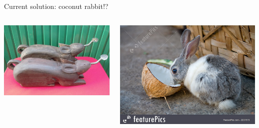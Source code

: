 \documentclass[10pt, svgnames]{beamer}
\begin{document}
\begin{frame}[label={sec:org1357d81}]{Current solution: coconut rabbit!?}
\begin{columns}
  \begin{column}{0.45\columnwidth}
    \begin{center}
      \includegraphics[width=\linewidth]{./pictures/coconut-rabbit.jpg}
    \end{center} 
  \end{column}

  \begin{column}{0.45\columnwidth}
    \begin{center}
      \includegraphics[width=\linewidth]{./pictures/rabbit-eating-coconut.jpg}
    \end{center}
  \end{column}
\end{columns}
\end{frame}
\end{document}

